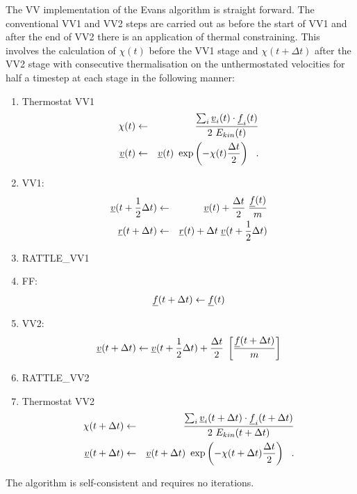 The VV implementation of the Evans algorithm is straight forward.
The conventional VV1 and VV2 steps are carried out as before
the start of VV1 and after the end of VV2 there is an application of
thermal constraining.  This involves the calculation of $\chi (t)$
before the VV1 stage and $\chi (t+\Delta t)$ after the VV2 stage
with consecutive thermalisation on the unthermostated velocities
for half a timestep at each stage in the following manner:
\begin{enumerate}
\item Thermostat VV1
\begin{eqnarray}
\chi (t) &\leftarrow& \frac {\sum_{i} \mbox{$\underline{v}$}_{i}(t) \cdot \mbox{$\underline{f}$}_{i}(t)} {2~E_{kin}(t)} \nonumber \\
\mbox{$\underline{v}$}(t) &\leftarrow& \mbox{$\underline{v}$}(t)~\exp \left( -\chi (t) {\Delta t \over 2} \right)~~.
\end{eqnarray}
\item VV1:
\begin{eqnarray}
\mbox{$\underline{v}$}(t + {1 \over 2} \Delta t) &\leftarrow& \mbox{$\underline{v}$}(t) +
{\Delta t \over 2} \; {\mbox{$\underline{f}$}(t) \over m} \nonumber \\
\mbox{$\underline{r}$}(t + \Delta t) &\leftarrow& \mbox{$\underline{r}$}(t) + \Delta t \;
\mbox{$\underline{v}$}(t + {1 \over 2} \Delta t)
\end{eqnarray}
\item RATTLE\_VV1
\item FF:
\begin{equation}
\mbox{$\underline{f}$}(t + \Delta t) \leftarrow \mbox{$\underline{f}$}(t)
\end{equation}
\item VV2:
\begin{equation}
\mbox{$\underline{v}$}(t + \Delta t) \leftarrow \mbox{$\underline{v}$}(t + {1 \over 2} \Delta t) +
{\Delta t \over 2} \; \left[{\mbox{$\underline{f}$}(t + \Delta t) \over m} \right]
\end{equation}
\item RATTLE\_VV2
\item Thermostat VV2
\begin{eqnarray}
\chi (t + \Delta t) &\leftarrow& \frac {\sum_{i} \mbox{$\underline{v}$}_{i}(t +
\Delta t) \cdot \mbox{$\underline{f}$}_{i}(t + \Delta t)} {2~E_{kin}(t + \Delta t)} \nonumber \\
\mbox{$\underline{v}$}(t + \Delta t) &\leftarrow& \mbox{$\underline{v}$}(t + \Delta t)~
\exp \left( -\chi (t + \Delta t) {\Delta t \over 2} \right)~~.
\end{eqnarray}
\end{enumerate}
The algorithm is self-consistent and requires no iterations.

